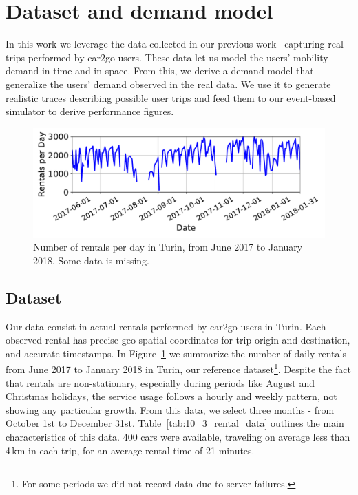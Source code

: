 \section{Dataset and demand model}
\label{sec:10_3_dataset}

In this work we leverage the data collected in our previous work~\cite{10_ciociola2017umap} capturing real trips performed by car2go users. These data let us model the users' mobility demand in time and in space. From this, we derive a demand model that generalize the users' demand observed in the real data. We use it to generate realistic traces describing possible user trips and feed them to our event-based simulator to derive performance figures.


\begin{figure}
    \begin{center}
            \includegraphics[width=\columnwidth]{fig/RentalsDay.pdf}
            \caption{Number of rentals per day in Turin, from June 2017 to January 2018. Some data is missing.}
            \label{fig:10_3_rentals_per_day}
            \end{center}
\end{figure}


\subsection{Dataset}

Our data consist in actual rentals performed by car2go users in Turin. Each observed rental has precise geo-spatial coordinates for trip origin and destination, and accurate timestamps. In Figure~\ref{fig:10_3_rentals_per_day} we summarize the number of daily rentals from June 2017 to January 2018 in Turin, our reference dataset\footnote{For some periods we did not record data due to server failures.}.  Despite the fact that rentals are non-stationary, especially during periods like August and Christmas holidays, the service usage follows a hourly and weekly pattern, not showing any particular growth. From this data, we select three months - from October 1st to December 31st.
Table~\ref{tab:10_3_rental_data} outlines the main characteristics of this data. 400 cars were available, traveling on average less than 4\,km in each trip, for an average rental time of 21 minutes.


